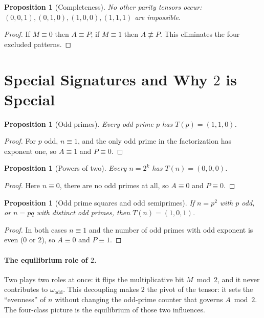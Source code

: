 \documentclass[11pt,a4paper]{article}
\numberwithin{equation}{section}
\numberwithin{figure}{section}
\numberwithin{table}{section}
\theoremstyle{plain}
\newtheorem{proposition}[theorem]{Proposition}
\theoremstyle{definition}
\theoremstyle{remark}
\begin{document}
\begin{proposition}[Completeness]
No other parity tensors occur: \((0,0,1),(0,1,0),(1,0,0),(1,1,1)\) are impossible.
\end{proposition}
\begin{proof}
If \(M\equiv 0\) then \(A\equiv P\); if \(M\equiv 1\) then \(A\not\equiv P\). This eliminates the four excluded patterns.
\end{proof}

\section{Special Signatures and Why \texorpdfstring{$2$}{2} is Special}
\begin{proposition}[Odd primes]
Every odd prime \(p\) has \(T(p)=(1,1,0)\).
\end{proposition}
\begin{proof}
For \(p\) odd, \(n\equiv 1\), and the only odd prime in the factorization has exponent one, so \(A\equiv 1\) and \(P\equiv 0\).
\end{proof}

\begin{proposition}[Powers of two]
Every \(n=2^k\) has \(T(n)=(0,0,0)\).
\end{proposition}
\begin{proof}
Here \(n\equiv 0\), there are no odd primes at all, so \(A\equiv 0\) and \(P\equiv 0\).
\end{proof}

\begin{proposition}[Odd prime squares and odd semiprimes]
If \(n=p^2\) with \(p\) odd, or \(n=pq\) with distinct odd primes, then \(T(n)=(1,0,1)\).
\end{proposition}
\begin{proof}
In both cases \(n\equiv 1\) and the number of odd primes with odd exponent is even (0 or 2), so \(A\equiv 0\) and \(P\equiv 1\).
\end{proof}

\paragraph{The equilibrium role of \(2\).}
Two plays two roles at once: it flips the multiplicative bit \(M\bmod 2\), and it never contributes to \(\omega_{\mathrm{odd}}\). This decoupling makes \(2\) the pivot of the tensor: it sets the ``evenness'' of \(n\) without changing the odd-prime counter that governs \(A\bmod 2\). The four-class picture is the equilibrium of those two influences.
\end{document}
